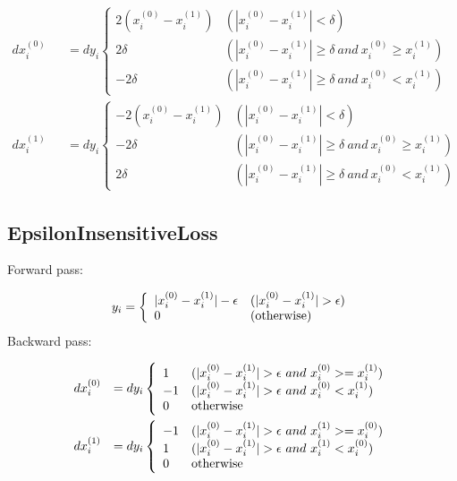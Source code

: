 \documentclass{article}
\begin{document}
\begin{eqnarray}
  dx^{(0)}_i &&= dy_i \left\{
  \begin{array}{ll}
    2 (x^{(0)}_i - x^{(1)}_i) & (|x^{(0)}_i - x^{(1)}_i| < \delta) \\
    2 \delta & (|x^{(0)}_i - x^{(1)}_i| \geq \delta \ and \ x^{(0)}_i \geq x^{(1)}_i) \\
    -2 \delta & (|x^{(0)}_i - x^{(1)}_i| \geq \delta \ and \ x^{(0)}_i < x^{(1)}_i)
  \end{array} \right. \\
  dx^{(1)}_i &&= dy_i \left\{
  \begin{array}{ll}
    - 2 (x^{(0)}_i - x^{(1)}_i) & (|x^{(0)}_i - x^{(1)}_i| < \delta) \\
    - 2 \delta & (|x^{(0)}_i - x^{(1)}_i| \geq \delta \ and \ x^{(0)}_i \geq x^{(1)}_i) \\
    2 \delta & (|x^{(0)}_i - x^{(1)}_i| \geq \delta \ and \ x^{(0)}_i < x^{(1)}_i)  \end{array} \right. 
\end{eqnarray}


\subsection{EpsilonInsensitiveLoss}

Forward pass:

\begin{eqnarray}
  y_i= \left\{
  \begin{array}{ll}
    | x^{(0)}_i - x^{(1)}_i | - \epsilon & (| x^{(0)}_i - x^{(1)}_i | > \epsilon) \\
    0 & ({\rm otherwise})
  \end{array} \right.
\end{eqnarray}
%
Backward pass:

\begin{eqnarray}
  dx^{(0)}_i &&= dy_i \left\{
  \begin{array}{ll}
    1  & ( | x^{(0)}_i - x^{(1)}_i | > \epsilon \ and \ x^{(0)}_i >= x^{(1)}_i) \\
    -1  & ( | x^{(0)}_i - x^{(1)}_i | > \epsilon \ and \ x^{(0)}_i < x^{(1)}_i) \\
    0 & {\rm otherwise}
  \end{array} \right. \\
  dx^{(1)}_i &&= dy_i \left\{
  \begin{array}{ll}
    -1  & ( | x^{(0)}_i - x^{(1)}_i | > \epsilon \ and \ x^{(1)}_i >= x^{(0)}_i) \\
    1  & ( | x^{(0)}_i - x^{(1)}_i | > \epsilon \ and \ x^{(1)}_i < x^{(0)}_i) \\
    0 & {\rm otherwise}
  \end{array} \right.
\end{eqnarray}
\end{document}
